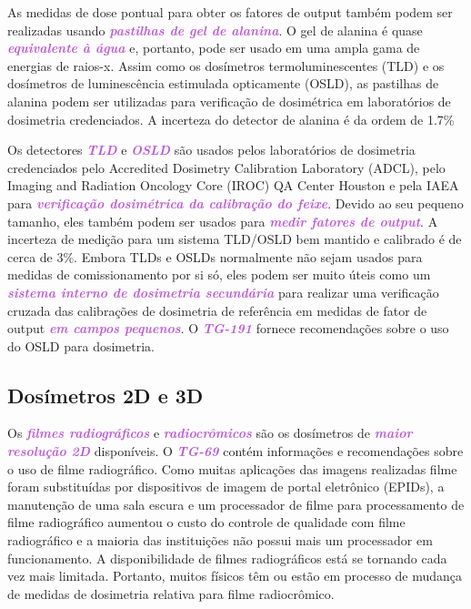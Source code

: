 \documentclass[11pt,a4paper]{article}
\begin{document}
	As medidas de dose pontual para obter os fatores de output também podem ser realizadas usando \textcolor{MediumOrchid}{\textbf{\textit{pastilhas de gel de alanina}}}. O gel de alanina é quase \textcolor{MediumOrchid}{\textbf{\textit{equivalente à água}}} e, portanto, pode ser usado em uma ampla gama de energias de raios-x. Assim como os dosímetros termoluminescentes (TLD) e os dosímetros de luminescência estimulada opticamente (OSLD), as pastilhas de alanina podem ser utilizadas para verificação de dosimétrica em laboratórios de dosimetria credenciados. A incerteza do detector de alanina é da ordem de 1.7\%

	Os detectores \textcolor{MediumOrchid}{\textbf{\textit{TLD}}} e \textcolor{MediumOrchid}{\textbf{\textit{OSLD}}} são usados pelos laboratórios de dosimetria credenciados pelo Accredited Dosimetry Calibration Laboratory (ADCL), pelo Imaging and Radiation Oncology Core (IROC) QA Center Houston e pela IAEA para \textcolor{MediumOrchid}{\textbf{\textit{verificação dosimétrica da calibração do feixe}}}. Devido ao seu pequeno tamanho, eles também podem ser usados para \textcolor{MediumOrchid}{\textbf{\textit{medir fatores de output}}}. A incerteza de medição para um sistema TLD/OSLD bem mantido e calibrado é de cerca de 3\%. Embora TLDs e OSLDs normalmente não sejam usados para medidas de comissionamento por si só, eles podem ser muito úteis como um \textcolor{MediumOrchid}{\textbf{\textit{sistema interno de dosimetria secundária}}} para realizar uma verificação cruzada das calibrações de dosimetria de referência em medidas de fator de output \textcolor{MediumOrchid}{\textbf{\textit{em campos pequenos}}}. O \textcolor{MediumOrchid}{\textbf{\textit{TG-191}}} fornece recomendações sobre o uso do OSLD para dosimetria. 

\subsection*{Dosímetros 2D e 3D}

	Os \textcolor{MediumOrchid}{\textbf{\textit{filmes radiográficos}}} e \textcolor{MediumOrchid}{\textbf{\textit{radiocrômicos}}} são os dosímetros de \textcolor{MediumOrchid}{\textbf{\textit{maior resolução 2D}}} disponíveis. O \textcolor{MediumOrchid}{\textbf{\textit{TG-69}}} contém informações e recomendações sobre o uso de filme radiográfico. Como muitas aplicações das imagens realizadas filme foram substituídas por dispositivos de imagem de portal eletrônico (EPIDs), a manutenção de uma sala escura e um processador de filme para processamento de filme radiográfico aumentou o custo do controle de qualidade com filme radiográfico e a maioria das instituições não possui mais um processador em funcionamento. A disponibilidade de filmes radiográficos está se tornando cada vez mais limitada. Portanto, muitos físicos têm ou estão em processo de mudança de medidas de dosimetria relativa para filme radiocrômico.
\end{document}
